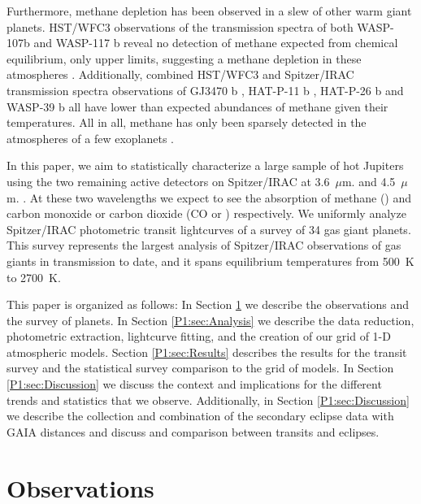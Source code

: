 Furthermore, methane depletion has been observed in a slew of other warm giant planets. HST/WFC3 observations of the transmission spectra of both WASP-107b and WASP-117 b reveal no detection of methane expected from chemical equilibrium, only upper limits, suggesting a methane depletion in these atmospheres \citep{Kreidberg2018b, Spake2018, Carone2020}. Additionally, combined HST/WFC3 and Spitzer/IRAC transmission spectra observations of GJ3470 b \citep{Benneke2019}, HAT-P-11 b \citep{Chachan2019}, HAT-P-26 b \citep{Wakeford2017} and WASP-39 b \citep{Wakeford2018} all have lower than expected abundances of methane given their temperatures. All in all, methane has only been sparsely detected in the atmospheres of a few exoplanets \citep{Swain2008,Tinetti2010,Guilluy2019}.

In this paper, we aim to statistically characterize a large sample of hot Jupiters using the two remaining active detectors on Spitzer/IRAC at 3.6~$\mu$m. and 4.5~$\mu$m. \citep{Fazio2004, Werner2004}. At these two wavelengths we expect to see the absorption of methane () and carbon monoxide or carbon dioxide (CO or ) respectively. We uniformly analyze Spitzer/IRAC photometric transit lightcurves of a survey of 34 gas giant planets. This survey represents the largest analysis of Spitzer/IRAC observations of gas giants in transmission to date, and it spans equilibrium temperatures from 500~K to 2700~K.

This paper is organized as follows: In Section \ref{P1:sec:observations} we describe the observations and the survey of planets. In Section \ref{P1:sec:Analysis} we describe the data reduction, photometric extraction, lightcurve fitting, and the creation of our grid of 1-D atmospheric models. Section \ref{P1:sec:Results} describes the results for the transit survey and the statistical survey comparison to the grid of models. In Section \ref{P1:sec:Discussion} we discuss the context and implications for the different trends and statistics that we observe. Additionally, in Section \ref{P1:sec:Discussion} we describe the collection and combination of the secondary eclipse data with GAIA distances and discuss and comparison between transits and eclipses.

\section{Observations}

\label{P1:sec:observations}

